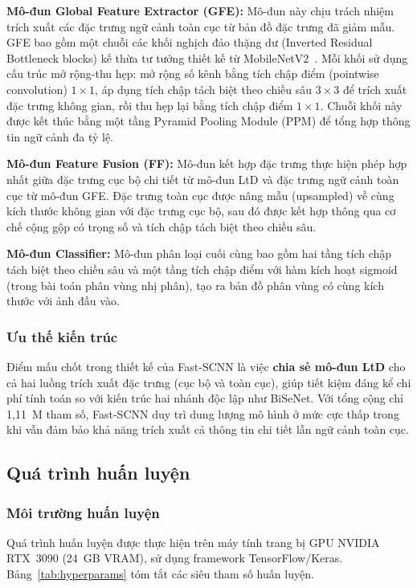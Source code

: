 \documentclass[conference]{IEEEtran}
\begin{document}
\textbf{Mô-đun Global Feature Extractor (GFE):} Mô-đun này chịu trách nhiệm trích xuất các đặc trưng ngữ cảnh toàn cục từ bản đồ đặc trưng đã giảm mẫu. GFE bao gồm một chuỗi các khối nghịch đảo thặng dư (Inverted Residual Bottleneck blocks) kế thừa tư tưởng thiết kế từ MobileNetV2~\cite{mobilenetv22018}. Mỗi khối sử dụng cấu trúc mở rộng-thu hẹp: mở rộng số kênh bằng tích chập điểm (pointwise convolution) $1 \times 1$, áp dụng tích chập tách biệt theo chiều sâu $3 \times 3$ để trích xuất đặc trưng không gian, rồi thu hẹp lại bằng tích chập điểm $1 \times 1$. Chuỗi khối này được kết thúc bằng một tầng Pyramid Pooling Module (PPM) để tổng hợp thông tin ngữ cảnh đa tỷ lệ.

\textbf{Mô-đun Feature Fusion (FF):} Mô-đun kết hợp đặc trưng thực hiện phép hợp nhất giữa đặc trưng cục bộ chi tiết từ mô-đun LtD và đặc trưng ngữ cảnh toàn cục từ mô-đun GFE. Đặc trưng toàn cục được nâng mẫu (upsampled) về cùng kích thước không gian với đặc trưng cục bộ, sau đó được kết hợp thông qua cơ chế cộng gộp có trọng số và tích chập tách biệt theo chiều sâu.

\textbf{Mô-đun Classifier:} Mô-đun phân loại cuối cùng bao gồm hai tầng tích chập tách biệt theo chiều sâu và một tầng tích chập điểm với hàm kích hoạt sigmoid (trong bài toán phân vùng nhị phân), tạo ra bản đồ phân vùng có cùng kích thước với ảnh đầu vào.

\subsubsection{Ưu thế kiến trúc}

Điểm mấu chốt trong thiết kế của Fast-SCNN là việc \textbf{chia sẻ mô-đun LtD} cho cả hai luồng trích xuất đặc trưng (cục bộ và toàn cục), giúp tiết kiệm đáng kể chi phí tính toán so với kiến trúc hai nhánh độc lập như BiSeNet. Với tổng cộng chỉ 1,11~M tham số, Fast-SCNN duy trì dung lượng mô hình ở mức cực thấp trong khi vẫn đảm bảo khả năng trích xuất cả thông tin chi tiết lẫn ngữ cảnh toàn cục.

\subsection{Quá trình huấn luyện}

\subsubsection{Môi trường huấn luyện}

Quá trình huấn luyện được thực hiện trên máy tính trang bị GPU NVIDIA RTX~3090 (24~GB VRAM), sử dụng framework TensorFlow/Keras. Bảng~\ref{tab:hyperparams} tóm tắt các siêu tham số huấn luyện.
\end{document}
